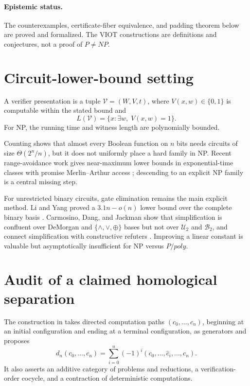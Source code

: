 \documentclass[11pt]{article}
\theoremstyle{definition}
\begin{document}
\paragraph{Epistemic status.}
The counterexamples, certificate-fiber equivalence, and padding theorem below
are proved and formalized. The VIOT constructions are definitions and
conjectures, not a proof of \(P\ne NP\).

\section{Circuit-lower-bound setting}

A verifier presentation is a tuple \(\mathcal V=(W,V,t)\), where
\(V(x,w)\in\{0,1\}\) is computable within the stated bound and
\[
  L(\mathcal V)=\{x:\exists w,\;V(x,w)=1\}.
\]
For NP, the running time and witness length are polynomially bounded.

Counting shows that almost every Boolean function on \(n\) bits needs
circuits of size \(\Theta(2^n/n)\), but it does not uniformly place a hard
family in NP. Recent range-avoidance work gives near-maximum lower bounds in
exponential-time classes with promise Merlin--Arthur access
\cite{RenWilliams}; descending to an explicit NP family is a central missing
step.

For unrestricted binary circuits, gate elimination remains the main explicit
method. Li and Yang proved a \(3.1n-o(n)\) lower bound over the complete binary
basis \cite{LiYang}. Carmosino, Dang, and Jackman show that simplification is
confluent over DeMorgan and \(\{\land,\lor,\oplus\}\) bases but not over
\(\mathcal U_2\) and \(\mathcal B_2\), and connect simplification with
constructive refuters \cite{CDJ}. Improving a linear constant is valuable but
asymptotically insufficient for NP versus \(P/poly\).

\section{Audit of a claimed homological separation}
\label{sec:audit}

The construction in \cite{Tang} takes directed computation paths
\((c_0,\ldots,c_n)\), beginning at an initial configuration and ending at a
terminal configuration, as generators and proposes
\[
 d_n(c_0,\ldots,c_n)=
 \sum_{i=0}^n(-1)^i(c_0,\ldots,\widehat c_i,\ldots,c_n).
\]
It also asserts an additive category of problems and reductions, a
verification-order cocycle, and a contraction of deterministic computations.
\end{document}
